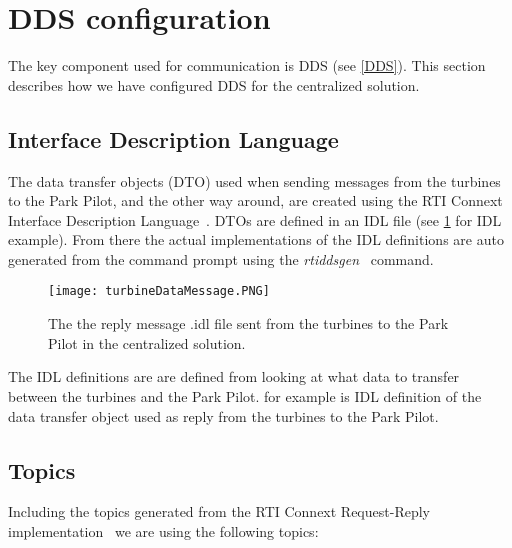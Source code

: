 \section{DDS configuration}\label{sec:ddsConfigCen} 

The key component used for communication is DDS (see \cref{DDS}). This section describes how we have configured DDS for the centralized solution.

\subsection{Interface Description Language}

The data transfer objects (DTO) used when sending messages from the turbines to the Park Pilot, and the other way around, are created using the RTI Connext Interface Description Language~\cite{rtiConnextUsersManual}. DTOs are defined in an IDL file (see \cref{fig:cenTurbineDataMessage} for IDL example). From there the actual implementations of the IDL definitions are auto generated from the command prompt using the \textit{rtiddsgen}~\cite{rtiConnextUsersManual} command.

\begin{figure}
	\centering
	\texttt{[image: turbineDataMessage.PNG]} 
	\caption[Centralized turbine reply message]{
		\label{fig:cenTurbineDataMessage} 
		\footnotesize{%
			The the reply message .idl file sent from the turbines to the Park Pilot in the centralized solution.
		}
	}
\end{figure}

The IDL definitions are are defined from looking at what data to transfer between the turbines and the Park Pilot.  for example is IDL definition of the data transfer object used as reply from the turbines to the Park Pilot. 

\subsection{Topics}

Including the topics generated from the RTI Connext Request-Reply implementation~\cite{rtiConnextUsersManual} we are using the following topics:


%	
%

